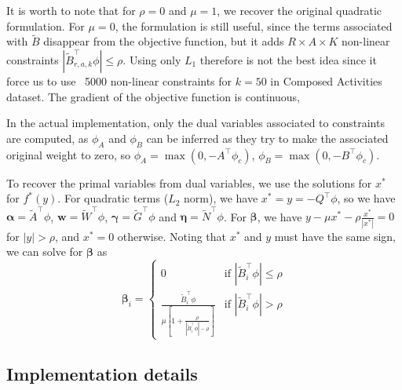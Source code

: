 \documentclass[10pt,letterpaper]{article}
\newcommand{\+}[1]{\ensuremath{{\boldsymbol #1}}}
\begin{document}
It is worth to note that for $\rho=0$ and $\mu = 1$, we recover the original quadratic formulation. For $\mu = 0$, the formulation is still useful, since the terms associated with $\tilde{B}$ disappear from the objective function, but it adds $R\times A \times K$ non-linear constraints $|\tilde{B}^\top_{r,a,k} \phi| \le \rho$. Using only $L_1$ therefore is not the best idea since it force us to use ~5000 non-linear constraints for $k=50$ in Composed Activities dataset. The gradient of the objective function is continuous, 

In the actual implementation, only the dual variables associated to constraints are computed, as $\phi_A$ and $\phi_B$ can be inferred as they try to make the associated original weight to zero, so $\phi_A = \max(0,-A^\top\phi_c)$, $\phi_B = \max(0,-B^\top\phi_c)$.

To recover the primal variables from dual variables, we use the solutions for $x^*$ for $f^*(y)$. For quadratic terms ($L_2$ norm), we have $x^* = y = -Q^\top\phi$, so we have $\+\alpha = \tilde{A}^\top\phi$, $\+w = \tilde{W}^\top\phi$, $\+\gamma = \tilde{G}^\top\phi$ and $\+\eta = \tilde{N}^\top\phi$.
For $\+\beta$, we have $y -\mu x^* - \rho \frac{x^*}{|x^*|} = 0$ for $|y|> \rho$, and $x^*=0$ otherwise. Noting that $x^*$ and $y$ must have the same sign, we can solve for $\+\beta$ as
\begin{equation}
\+\beta_i=\begin{cases} 0 & \mbox{if } |\tilde{B}_i^\top\phi| \le \rho  \\ \frac{\tilde{B}_i^\top \phi}{\mu[1 + \frac{\rho}{|\tilde{B}_i^\top\phi|-\rho}]} &  \mbox{if } |\tilde{B}_i^\top\phi| > \rho  \end{cases}
\end{equation}

\subsection{Implementation details}

%
%
%
%
%
%
%
%
%
%
%
%
\end{document}
